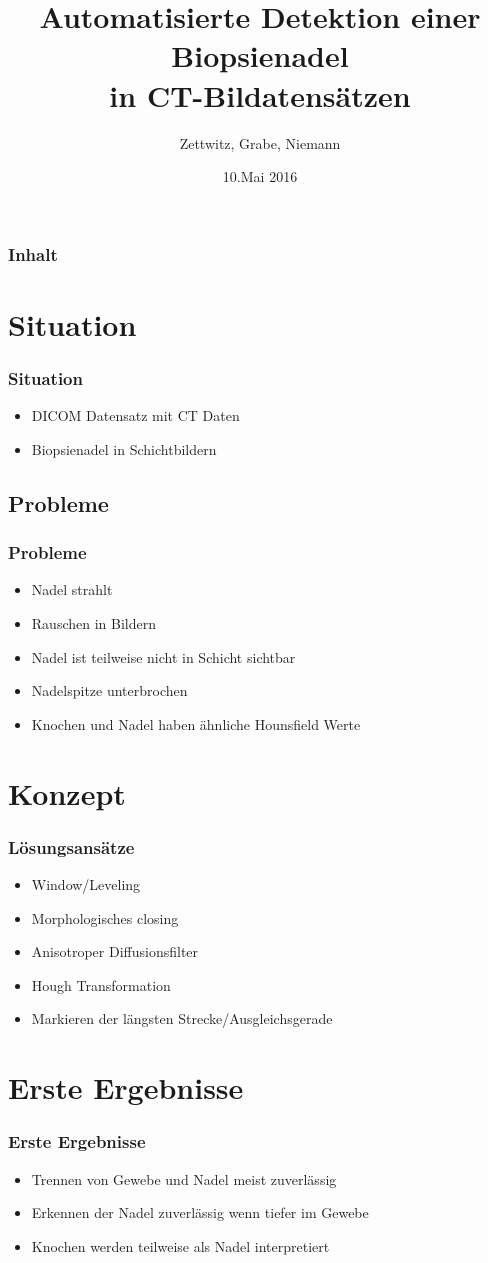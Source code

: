\documentclass[11pt]{beamer}
\author{Zettwitz, Grabe, Niemann}
\title{Automatisierte Detektion einer Biopsienadel \\ in CT-Bildatensätzen}
\date{10.Mai 2016}
\begin{document}
\begin{frame}
\titlepage
\end{frame}

\begin{frame}
\frametitle{Inhalt} 
\tableofcontents
\end{frame}


\section{Situation}
\begin{frame}
\frametitle{Situation}
\begin{itemize} 
\item DICOM Datensatz mit CT Daten
\item Biopsienadel in Schichtbildern
\end{itemize}
\end{frame}


\subsection{Probleme}
\begin{frame}
\frametitle{Probleme}
\begin{itemize}
\item Nadel strahlt
\item Rauschen in Bildern
\item Nadel ist teilweise nicht in Schicht sichtbar
\item Nadelspitze unterbrochen
\item Knochen und Nadel haben ähnliche Hounsfield Werte
\end{itemize}
\end{frame}

\section{Konzept}
\begin{frame}
\frametitle{Lösungsansätze}
\begin{itemize}
\item Window/Leveling
\item Morphologisches closing
\item Anisotroper Diffusionsfilter
\item Hough Transformation
\item Markieren der längsten Strecke/Ausgleichsgerade
\end{itemize}
\end{frame}


\section{Erste Ergebnisse}
\begin{frame}
\frametitle{Erste Ergebnisse}
\begin{itemize}
\item Trennen von Gewebe und Nadel meist zuverlässig
\item Erkennen der Nadel zuverlässig wenn tiefer im Gewebe
\item Knochen werden teilweise als Nadel interpretiert
\end{itemize}
\end{frame}
\end{document}
